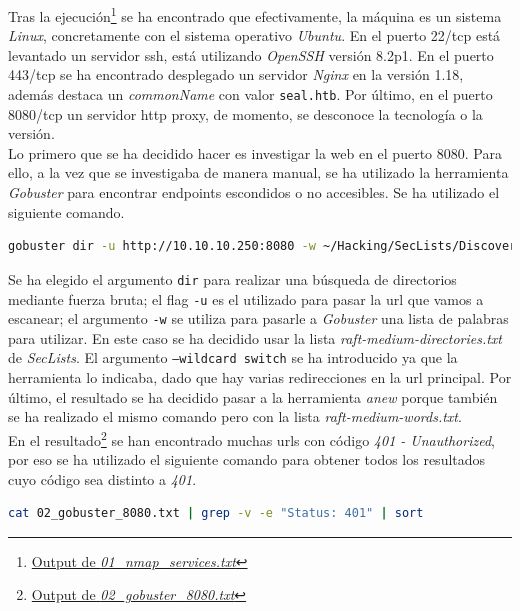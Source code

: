 Tras la ejecución\footnote{\href{https://github.com/VictorNS69/TFM/blob/main/machines/seal/01_nmap_services.txt}{Output de \textit{01\_nmap\_services.txt}}} se ha encontrado que efectivamente, la máquina es un sistema \textit{Linux}, concretamente con el sistema operativo \textit{Ubuntu}. En el puerto 22/\acrshort{tcp} está levantado un servidor \acrshort{ssh}, está utilizando \textit{OpenSSH}\cite{openssh} versión 8.2p1. En el puerto 443/\acrshort{tcp} se ha encontrado desplegado un servidor \textit{Nginx}\cite{nginx} en la versión 1.18, además destaca  un \textit{commonName} con valor \texttt{seal.htb}. Por último, en el puerto 8080/\acrshort{tcp} un servidor \acrshort{http} proxy, de momento, se desconoce la tecnología o la versión.\\

Lo primero que se ha decidido hacer es investigar la web en el puerto 8080. Para ello, a la vez que se investigaba de manera manual, se ha utilizado la herramienta \textit{Gobuster}\cite{gobuster} para encontrar endpoints escondidos o no accesibles. Se ha utilizado el siguiente comando.
\begin{lstlisting}[language=bash]
gobuster dir -u http://10.10.10.250:8080 -w ~/Hacking/SecLists/Discovery/Web-Content/raft-medium-directories.txt --wildcard switch | anew 02_gobuster_8080.txt
\end{lstlisting}

Se ha elegido el argumento \texttt{dir} para realizar una búsqueda de directorios mediante fuerza bruta; el flag \texttt{-u} es el utilizado para pasar la \acrshort{url} que vamos  a escanear; el argumento \texttt{-w} se utiliza para pasarle a \textit{Gobuster} una lista de palabras para utilizar. En este caso se ha decidido usar la lista \textit{raft-medium-directories.txt} de \textit{SecLists}\cite{seclists}. El argumento \texttt{--wildcard switch} se ha introducido ya que la herramienta lo indicaba, dado que hay varias redirecciones en la \acrshort{url} principal. Por último, el resultado se ha decidido pasar a la herramienta \textit{anew}\cite{anew} porque también se ha realizado el mismo comando pero con la lista \textit{raft-medium-words.txt}.\\

En el resultado\footnote{\href{https://github.com/VictorNS69/TFM/blob/main/machines/seal/02_gobuster_8080.txt}{Output de \textit{02\_gobuster\_8080.txt}}} se han encontrado muchas \acrshort{url}s con código \textit{401 - Unauthorized}, por eso se ha utilizado el siguiente comando para obtener todos los resultados cuyo código sea distinto a \textit{401}.
\begin{lstlisting}[language=bash]
cat 02_gobuster_8080.txt | grep -v -e "Status: 401" | sort
\end{lstlisting}

